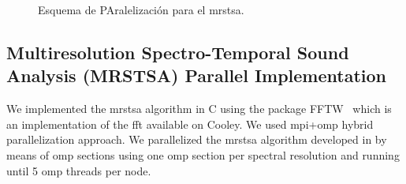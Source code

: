 {\begin{figure}[tb] 
    \centering
    \hfill
	\caption{Esquema de PAralelización para el \gls{mrstsa}.}
  \label{fig:MRSTSA_Parallelization} 
\end{figure}
}{
\subsection{Multiresolution Spectro-Temporal Sound Analysis (MRSTSA) Parallel Implementation}

We implemented the \gls{mrstsa} algorithm in C using the package FFTW~\cite{fftw} which is an implementation of the \gls{fft} available on Cooley. We used \gls{mpi}+\gls{omp} hybrid parallelization approach. We parallelized the \gls{mrstsa} algorithm developed in \cite{10.1371/journal.pone.0217966} by means of \gls{omp} sections using one \gls{omp} section per spectral resolution and running until 5 \gls{omp} threads per node.

}
